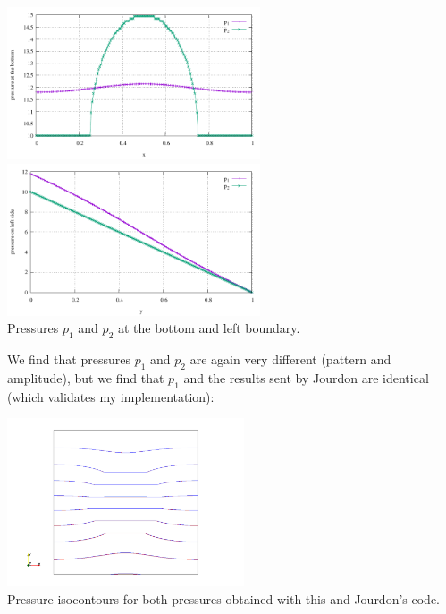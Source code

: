 \begin{center}
\includegraphics[width=7.5cm]{python_codes/fieldstone_119/results/exp4/bottom}
\includegraphics[width=7.5cm]{python_codes/fieldstone_119/results/exp4/left}\\
{\captionfont Pressures $p_1$ and $p_2$ at the bottom and left boundary.}
\end{center}

We find that pressures $p_1$ and $p_2$ are again very different (pattern and amplitude), but 
we find that $p_1$ and the results sent by Jourdon are identical (which validates my implementation):

\begin{center}
\includegraphics[width=7cm]{python_codes/fieldstone_119/results/exp4/p1_both}\\
{\captionfont Pressure isocontours for both pressures obtained with this \stone and Jourdon's code.}
\end{center}
 
